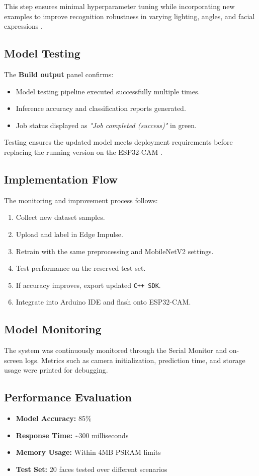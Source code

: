 This step ensures minimal hyperparameter tuning while incorporating new examples to improve recognition robustness in varying lighting, angles, and facial expressions \cite{Sze:2017}.

\subsection{Model Testing}
The \textbf{Build output} panel confirms:
\begin{itemize}
    \item Model testing pipeline executed successfully multiple times.
    \item Inference accuracy and classification reports generated.
    \item Job status displayed as \textit{"Job completed (success)"} in green.
\end{itemize}

Testing ensures the updated model meets deployment requirements before replacing the running version on the ESP32-CAM \cite{Han:2015}.

\subsection{Implementation Flow}
The monitoring and improvement process follows:
\begin{enumerate}
    \item Collect new dataset samples.
    \item Upload and label in Edge Impulse.
    \item Retrain with the same preprocessing and MobileNetV2 settings.
    \item Test performance on the reserved test set.
    \item If accuracy improves, export updated \texttt{C++ SDK}.
    \item Integrate into Arduino IDE and flash onto ESP32-CAM.
\end{enumerate}

\subsection{Model Monitoring}
The system was continuously monitored through the Serial Monitor and on-screen logs. Metrics such as camera initialization, prediction time, and storage usage were printed for debugging.

\subsection{Performance Evaluation}
\begin{itemize}
    \item \textbf{Model Accuracy:} 85\%
    \item \textbf{Response Time:} \textasciitilde300 milliseconds
    \item \textbf{Memory Usage:} Within 4MB PSRAM limits
    \item \textbf{Test Set:} 20 faces tested over different scenarios
\end{itemize}

